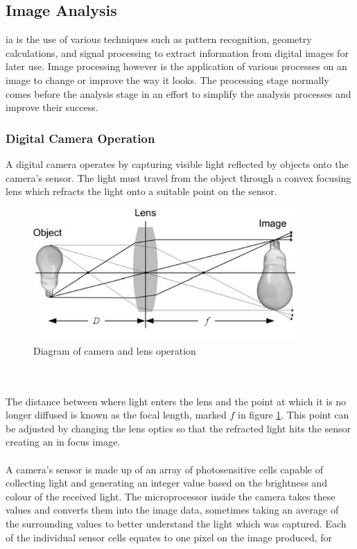 \subsection{Image Analysis}
	\gls{ia} is the use of various techniques such as pattern recognition, 
	geometry calculations, and signal processing to extract information from 
	digital images for later use. Image processing however is the application 
	of various processes on an image to change or improve the way it looks. The 
	processing stage normally comes before the analysis stage in an effort to 
	simplify the analysis processes and improve their success.
	\subsubsection{Digital Camera Operation}
	A digital camera operates by capturing visible light reflected by objects 
	onto the camera's sensor. The light must travel from the object through a convex focusing lens 
	which refracts the light onto a suitable point on the sensor.
	\begin{figure}[h!]
		\centering
		\includegraphics[width=10cm]{../images/camera_bulb.PNG}
		\caption{Diagram of camera and lens operation \citep{introtoprocessing}}
		\label{fig:camera_diagram}
	\end{figure}
	\\\\
	The distance between where light enters the lens and the point at which it is no longer 
	diffused is known as the focal length, marked $f$ in figure \ref{fig:camera_diagram}. This 
	point can be adjusted by changing the lens optics so that the refracted 
	light hits the sensor creating an in focus image.
	\\\\
	A camera's sensor is made up of an array of photosensitive cells capable of collecting light and generating an integer value based on the brightness and colour of the received light. The microprocessor inside the camera takes these values and converts them into the image data, sometimes taking an average of the surrounding values to better understand the light which was captured. Each of the individual sensor cells equates to one pixel on the image produced, for 

